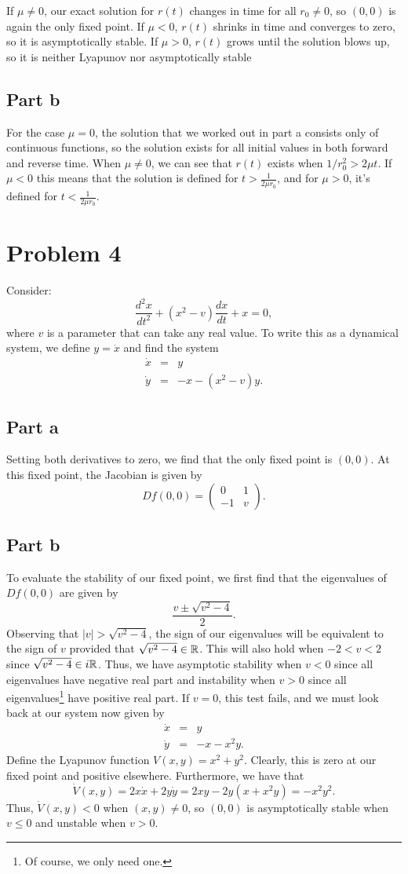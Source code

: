 \documentclass{article}
\begin{document}
If $\mu\neq0$, our exact solution for $r(t)$ changes in time for all $r_0\neq0$, so $(0,0)$ is again the only fixed point. If $\mu<0$, $r(t)$ shrinks in time and converges to zero, so it is asymptotically stable. If $\mu>0$, $r(t)$ grows until the solution blows up, so it is neither Lyapunov nor asymptotically stable
\subsection{Part b}
For the case $\mu=0$, the solution that we worked out in part a consists only of continuous functions, so the solution exists for all initial values in both forward and reverse time. When $\mu\neq0$, we can see that $r(t)$ exists when $1/r_0^2>2\mu t$. If $\mu<0$ this means that the solution is defined for $t>\frac{1}{2\mu r_0}$, and for $\mu>0$, it's defined for $t<\frac{1}{2\mu r_0}$.

\section{Problem 4}
Consider:  $$\frac{d^2x}{dt^2} + (x^2 - v) \frac{dx}{dt} + x =0, $$ where $v$ is a parameter that can take any real value. To write this as a dynamical system, we define $y=\dot x$ and find the system 
\begin{eqnarray*} 
	\dot x &=& y  \\
	\dot y &=& -x -(x^2-v)y.
\end{eqnarray*}
\subsection{Part a}
Setting both derivatives to zero, we find that the only fixed point is $(0,0)$. At this fixed point, the Jacobian is given by
\[
Df(0,0)=\begin{pmatrix}
	0 &1\\
	-1&v
\end{pmatrix}.
\]

\subsection{Part b}
To evaluate the stability of our fixed point, we first find that the eigenvalues of $Df(0,0)$ are given by 
\[
\frac{v\pm\sqrt{v^2-4}}{2}.
\]
Observing that $|v|>\sqrt{v^2-4}$, the sign of our eigenvalues will be equivalent to the sign of $v$ provided that $\sqrt{v^2-4}\in\mathbb{R}$. This will also hold when $-2<v<2$ since $\sqrt{v^2-4}\in i\mathbb{R}$. Thus, we have asymptotic stability when $v<0$ since all eigenvalues have negative real part and instability when $v>0$ since all eigenvalues\footnote{Of course, we only need one.} have positive real part. If $v=0$, this test fails, and we must look back at our system now given by
\begin{eqnarray*} 
	\dot x &=& y  \\
	\dot y &=& -x -x^2y.
\end{eqnarray*}
Define the Lyapunov function $V(x,y)=x^2+y^2$. Clearly, this is zero at our fixed point and positive elsewhere. Furthermore, we have that 
\[
\dot V(x,y)=2x\dot x+2y\dot y=2xy-2y(x+x^2y)=-x^2y^2.
\]
Thus, $\dot V(x,y)<0$ when $(x,y)\neq0$, so $(0,0)$ is asymptotically stable when $v\leq0$ and unstable when $v>0$.
\end{document}
